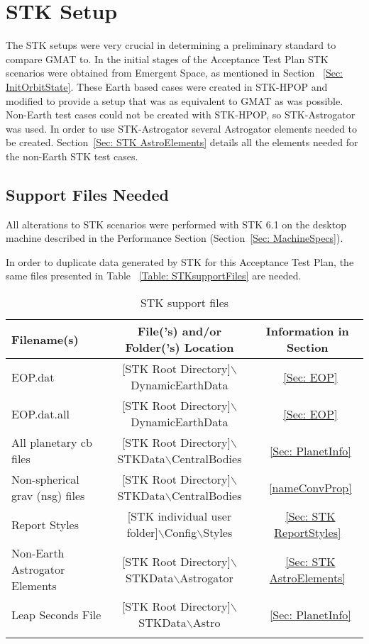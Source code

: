 \chapter{STK Setup}
\label{Ch:STKsetup}

The STK setups were very crucial in determining a preliminary
standard to compare GMAT to. In the initial stages of the Acceptance
Test Plan STK scenarios were obtained from Emergent Space, as
mentioned in Section ~\ref{Sec: InitOrbitState}. These Earth based
cases were created in STK-HPOP and modified to provide a setup that
was as equivalent to GMAT as was possible. Non-Earth test cases
could not be created with STK-HPOP, so STK-Astrogator was used. In
order to use STK-Astrogator several Astrogator elements needed to be
created. Section~\ref{Sec: STK AstroElements} details all the
elements needed for the non-Earth STK test cases.

\section{Support Files Needed}
All alterations to STK scenarios were performed with STK 6.1 on the
desktop machine described in the Performance Section
(Section~\ref{Sec: MachineSpecs}).

In order to duplicate data generated by STK for this Acceptance Test
Plan, the same files presented in Table ~\ref{Table:
STKsupportFiles} are needed.

\begin{table}[htb]
\centering \caption{STK support files}
    \begin{tabular}{lcc}
    \hline\hline
        Filename(s) & File('s) and/or Folder('s) Location & Information in Section \\
        \hline
         EOP.dat     & [STK Root Directory]$\backslash$DynamicEarthData & ~\ref{Sec: EOP} \\
         EOP.dat.all & [STK Root Directory]$\backslash$DynamicEarthData & ~\ref{Sec: EOP} \\
         All planetary cb files & [STK Root Directory]$\backslash$STKData$\backslash$CentralBodies & ~\ref{Sec: PlanetInfo} \\
         Non-spherical grav (nsg) files & [STK Root Directory]$\backslash$STKData$\backslash$CentralBodies & ~\ref{nameConvProp} \\
         Report Styles & [STK individual user folder]$\backslash$Config$\backslash$Styles & ~\ref{Sec: STK ReportStyles} \\
         Non-Earth Astrogator Elements & [STK Root Directory]$\backslash$STKData$\backslash$Astrogator & ~\ref{Sec: STK AstroElements} \\
         Leap Seconds File & [STK Root Directory]$\backslash$STKData$\backslash$Astro & ~\ref{Sec: PlanetInfo} \\
      \hline\hline
      \label{Table: STKsupportFiles}
\end{tabular}
\end{table}

